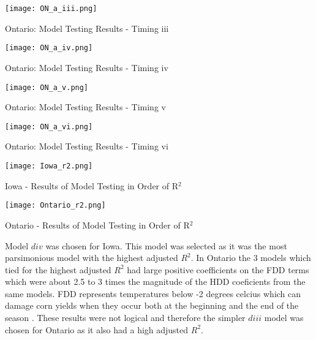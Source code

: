 \begin{table}[H]
    \centering
    \texttt{[image: ON\_a\_iii.png]}
    \caption{Ontario: Model Testing Results - Timing iii}
    \label{fig:my_label}
\end{table}

\begin{table}[H]
    \centering
    \texttt{[image: ON\_a\_iv.png]}
    \caption{Ontario: Model Testing Results - Timing iv}
    \label{fig:my_label}
\end{table}

\begin{table}[H]
    \centering
    \texttt{[image: ON\_a\_v.png]}
    \caption{Ontario: Model Testing Results - Timing v}
    \label{fig:my_label}
\end{table}

\begin{table}[H]
    \centering
    \texttt{[image: ON\_a\_vi.png]}
    \caption{Ontario: Model Testing Results - Timing vi}
    \label{fig:my_label}
\end{table}

\begin{table}[H]
   
    \texttt{[image: Iowa\_r2.png]}
    \caption{Iowa - Results of Model Testing in Order of R$^2$}
    \label{fig:my_label}
\end{table}

\begin{table}[H]
   
    \texttt{[image: Ontario\_r2.png]}
    \caption{Ontario - Results of Model Testing in Order of R$^2$}
    \label{fig:my_label}
\end{table}


Model $div$ was chosen for Iowa. This model was selected as it was the most parsimonious model with the highest adjusted $R^2$. In Ontario the 3 models which tied for the highest adjusted $R^2$ had large positive coefficients on the FDD terms which were about 2.5 to 3 times the magnitude of the HDD coeficients from the same models. FDD represents temperatures below -2 degrees celcius which can damage corn yields when they occur both at the beginning and the end of the season \citep{OMAFRA}. These results were not logical and therefore the simpler $diii$ model was chosen for Ontario as it also had a high adjusted $R^2$.



